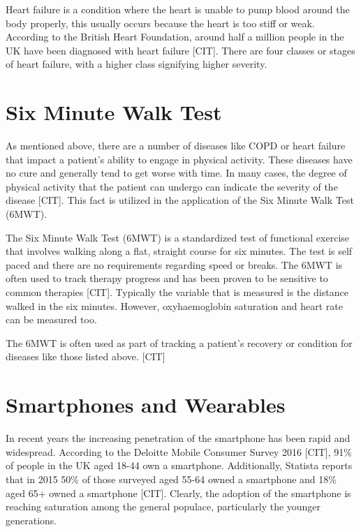             Heart failure is a condition where the heart is unable to pump blood around the body properly, this usually occurs because the heart is too stiff or weak. According to the British Heart Foundation, around half a million people in the UK have been diagnosed with heart failure [CIT]. There are four classes or stages of heart failure, with a higher class signifying higher severity. 

        \section{Six Minute Walk Test}

            As mentioned above, there are a number of diseases like COPD or heart failure that impact a patient's ability to engage in physical activity. These diseases have no cure and generally tend to get worse with time. In many cases, the degree of physical activity that the patient can undergo can indicate the severity of the disease [CIT]. This fact is utilized in the application of the Six Minute Walk Test (6MWT).

            The Six Minute Walk Test (6MWT) is a standardized test of functional exercise that involves walking along a flat, straight course for six minutes. The test is self paced and there are no requirements regarding speed or breaks. The 6MWT is often used to track therapy progress and has been proven to be sensitive to common therapies [CIT]. Typically the variable that is measured is the distance walked in the six minutes. However, oxyhaemoglobin saturation and heart rate can be measured too. 

            The 6MWT is often used as part of tracking a patient's recovery or condition for diseases like those listed above. [CIT]

        \section{Smartphones and Wearables}

            In recent years the increasing penetration of the smartphone has been rapid and widespread. According to the Deloitte Mobile Consumer Survey 2016 [CIT], 91\% of people in the UK aged 18-44 own a smartphone. Additionally, Statista reports that in 2015 50\% of those surveyed aged 55-64 owned a smartphone and 18\% aged 65+ owned a smartphone [CIT]. Clearly, the adoption of the smartphone is reaching saturation among the general populace, particularly the younger generations.

